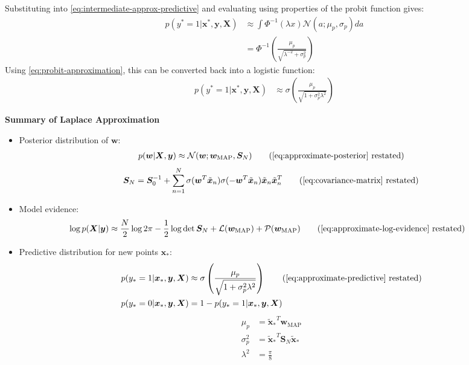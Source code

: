 \documentclass[a4paper]{article}
\begin{document}
    Substituting into \autoref{eq:intermediate-approx-predictive} and evaluating using properties of the probit function gives:
    \begin{align*}
         p(y^* = 1 | \bm{x}^*, \bm{y}, \bm{X}) &\approx \int \Phi^{-1}(\lambda x) \mathcal{N}(a; \mu_p, \sigma_p) da \nonumber \\
        &= \Phi^{-1}\left(\frac{\mu_p}{\sqrt{\lambda^{-2} + \sigma_p^2}}\right)
     \end{align*}
    Using \autoref{eq:probit-approximation}, this can be converted back into a logistic function:
    \begin{align}
        \label{eq:approximate-predictive}
         p(y^* = 1 | \bm{x}^*, \bm{y}, \bm{X}) &\approx \sigma\left(\frac{\mu_p}{\sqrt{1 + \sigma_p^2\lambda^2}}\right)
    \end{align}

    \begin{mdframed}
    \noindent\textbf{Summary of Laplace Approximation} \\
    \begin{itemize}
        \item Posterior distribution of $\bm{w}$:
        \begin{align*}
            p(\bm{w} | \bm{X}, \bm{y}) \approx \mathcal{N}(\bm{w}; \bm{w}_\text{MAP}, \bm{S}_N) \tag{\ref{eq:approximate-posterior} restated}
        \end{align*}
        \begin{align*}
            \bm{S}_N = \bm{S}_0^{-1} + \sum_{n=1}^N \sigma(\bm{w}^T \tilde{\bm{x}}_n) \sigma(-\bm{w}^T \tilde{\bm{x}}_n) \tilde{\bm{x}}_n\tilde{\bm{x}}_n^T \tag{\ref{eq:covariance-matrix} restated}
        \end{align*}
        \item Model evidence:
        \begin{align}
            \log p(\bm{X} | \bm{y}) &\approx  \frac{N}{2}\log 2\pi - \frac{1}{2}\log \det \bm{S}_N + \mathcal{L}(\bm{w}_\text{MAP}) + \mathcal{P}(\bm{w}_\text{MAP})
                \tag{\ref{eq:approximate-log-evidence} restated}
        \end{align}
        \item Predictive distribution for new points $\bm{x}_*$:
        \begin{align*}
            p(y_* = 1 | \bm{x}_*, \bm{y}, \bm{X}) &\approx \sigma\left(\frac{\mu_p}{\sqrt{1 + \sigma_p^2\lambda^2}}\right) \tag{\ref{eq:approximate-predictive} restated} \\
            p(y_* = 0 | \bm{x}_*, \bm{y}, \bm{X}) &= 1 - p(y_* = 1 | \bm{x}_*, \bm{y}, \bm{X}) \nonumber
        \end{align*}
            \begin{align*}
        \mu_p &= {\tilde{\bm{x}}_*}^T \bm{w}_\text{MAP} \\
        \sigma_p^2 &= {\tilde{\bm{x}}_*}^T \bm{S}_N \tilde{\bm{x}}_* \\
        \lambda^2 &= \frac{\pi}{8}
    \end{align*}
    \end{itemize}
    \end{mdframed}
\end{document}
